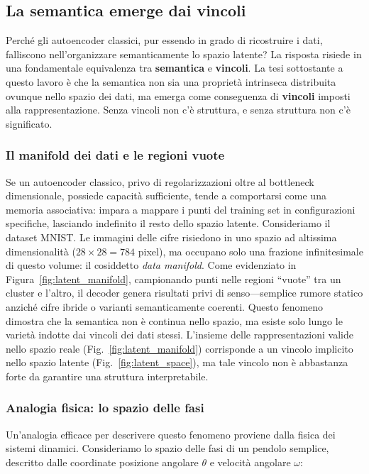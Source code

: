 \subsection{La semantica emerge dai vincoli}
\label{sec:semantics_from_constraints}

Perché gli autoencoder classici, pur essendo in grado di ricostruire i dati, falliscono nell'organizzare semanticamente lo spazio latente? La risposta risiede in una fondamentale equivalenza tra \textbf{semantica} e \textbf{vincoli}.
La tesi sottostante a questo lavoro è che la semantica non sia una proprietà intrinseca distribuita ovunque nello spazio dei dati, ma emerga come conseguenza di \textbf{vincoli} imposti alla rappresentazione. Senza vincoli non c'è struttura, e senza struttura non c'è significato.

\subsubsection{Il manifold dei dati e le regioni vuote}

Se un autoencoder classico, privo di regolarizzazioni oltre al bottleneck dimensionale, possiede capacità sufficiente, tende a comportarsi come una memoria associativa: impara a mappare i punti del training set in configurazioni specifiche, lasciando indefinito il resto dello spazio latente.
Consideriamo il dataset MNIST. Le immagini delle cifre risiedono in uno spazio ad altissima dimensionalità ($28 \times 28 = 784$ pixel), ma occupano solo una frazione infinitesimale di questo volume: il cosiddetto \textit{data manifold}. Come evidenziato in Figura~\ref{fig:latent_manifold}, campionando punti nelle regioni ``vuote'' tra un cluster e l'altro, il decoder genera risultati privi di senso—semplice rumore statico anziché cifre ibride o varianti semanticamente coerenti.
Questo fenomeno dimostra che la semantica non è continua nello spazio, ma esiste solo lungo le varietà indotte dai vincoli dei dati stessi. L'insieme delle rappresentazioni valide nello spazio reale (Fig.~\ref{fig:latent_manifold}) corrisponde a un vincolo implicito nello spazio latente (Fig.~\ref{fig:latent_space}), ma tale vincolo non è abbastanza forte da garantire una struttura interpretabile.

\subsubsection{Analogia fisica: lo spazio delle fasi}

Un'analogia efficace per descrivere questo fenomeno proviene dalla fisica dei sistemi dinamici. Consideriamo lo spazio delle fasi di un pendolo semplice, descritto dalle coordinate posizione angolare $\theta$ e velocità angolare $\omega$:

